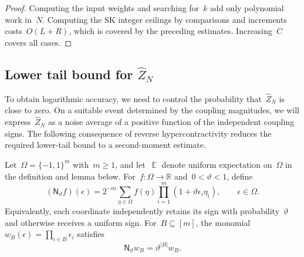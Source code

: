 \documentclass[letterpaper,11pt,reqno]{amsart}
\renewcommand{\geq}{\geqslant}
\DeclareMathOperator{\E}{\mathds{E}}
\begin{document}
\begin{proof}
Computing the input weights and searching for~$k$ add only polynomial work in~$N$. Computing the SK integer ceilings by comparisons and increments costs~$O(L+R)$, which is covered by the preceding estimates. Increasing~$C$ covers all cases.
\end{proof}

\subsection{Lower tail bound for $\hat{Z}_N$}\label{subsec:lower-tail}

To obtain logarithmic accuracy, we need to control the probability that~$\widehat Z_N$ is close to zero. On a suitable event determined by the coupling magnitudes, we will express~$\widehat Z_N$ as a noise average of a positive function of the independent coupling signs. The following consequence of reverse hypercontractivity reduces the required lower-tail bound to a second-moment estimate.

Let~$\Omega=\{-1,1\}^m$ with~$m\geq1$, and let~$\E$ denote uniform expectation on~$\Omega$ in the definition and lemma below. For~$f:\Omega\to\mathbb R$ and~$0<\vartheta<1$, define
\begin{equation*}
(\mathsf N_\vartheta f)(\epsilon)
=2^{-m}\sum_{\eta\in\Omega}f(\eta)
\prod_{i=1}^m(1+\vartheta\epsilon_i\eta_i),
\qquad \epsilon\in\Omega.
\end{equation*}
Equivalently, each coordinate independently retains its sign with probability~$\vartheta$ and otherwise receives a uniform sign. For~$B\subseteq[m]$, the monomial~$w_B(\epsilon)=\prod_{i\in B}\epsilon_i$ satisfies
\begin{equation*}
\mathsf N_\vartheta w_B=\vartheta^{|B|}w_B.
\end{equation*}
\end{document}
